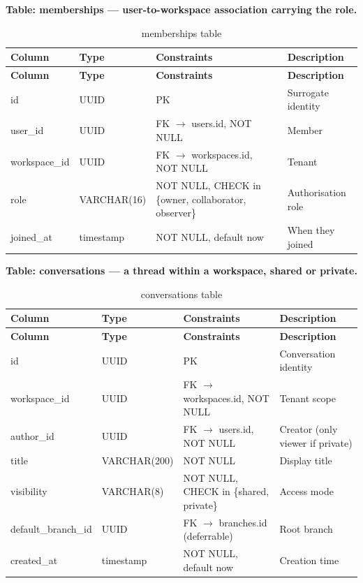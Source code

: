 \documentclass[12pt,a4paper]{report}
\begin{document}
\noindent\textbf{Table: memberships --- user-to-workspace association carrying the role.}

\begingroup
\setlength{\parskip}{0pt}\renewcommand{\arraystretch}{1.32}\footnotesize
\begin{xltabular}{\textwidth}{>{\hsize\raggedright\arraybackslash}X >{\hsize\raggedright\arraybackslash}X >{\hsize\raggedright\arraybackslash}X >{\hsize\raggedright\arraybackslash}X}
\caption{memberships table}\\
\toprule
\textbf{Column} & \textbf{Type} & \textbf{Constraints} & \textbf{Description} \\
\midrule\endfirsthead
\toprule
\textbf{Column} & \textbf{Type} & \textbf{Constraints} & \textbf{Description} \\
\midrule\endhead
\bottomrule\endfoot
id & UUID & PK & Surrogate identity \\
user\_id & UUID & FK $\rightarrow$ users.id, NOT NULL & Member \\
workspace\_id & UUID & FK $\rightarrow$ workspaces.id, NOT NULL & Tenant \\
role & VARCHAR(16) & NOT NULL, CHECK in \{owner, collaborator, observer\} & Authorisation role \\
joined\_at & timestamp & NOT NULL, default now & When they joined \\
\end{xltabular}
\endgroup

\noindent\textbf{Table: conversations --- a thread within a workspace, shared or private.}

\begingroup
\setlength{\parskip}{0pt}\renewcommand{\arraystretch}{1.32}\footnotesize
\begin{xltabular}{\textwidth}{>{\hsize\raggedright\arraybackslash}X >{\hsize\raggedright\arraybackslash}X >{\hsize\raggedright\arraybackslash}X >{\hsize\raggedright\arraybackslash}X}
\caption{conversations table}\\
\toprule
\textbf{Column} & \textbf{Type} & \textbf{Constraints} & \textbf{Description} \\
\midrule\endfirsthead
\toprule
\textbf{Column} & \textbf{Type} & \textbf{Constraints} & \textbf{Description} \\
\midrule\endhead
\bottomrule\endfoot
id & UUID & PK & Conversation identity \\
workspace\_id & UUID & FK $\rightarrow$ workspaces.id, NOT NULL & Tenant scope \\
author\_id & UUID & FK $\rightarrow$ users.id, NOT NULL & Creator (only viewer if private) \\
title & VARCHAR(200) & NOT NULL & Display title \\
visibility & VARCHAR(8) & NOT NULL, CHECK in \{shared, private\} & Access mode \\
default\_branch\_id & UUID & FK $\rightarrow$ branches.id (deferrable) & Root branch \\
created\_at & timestamp & NOT NULL, default now & Creation time \\
\end{xltabular}
\endgroup
\end{document}
